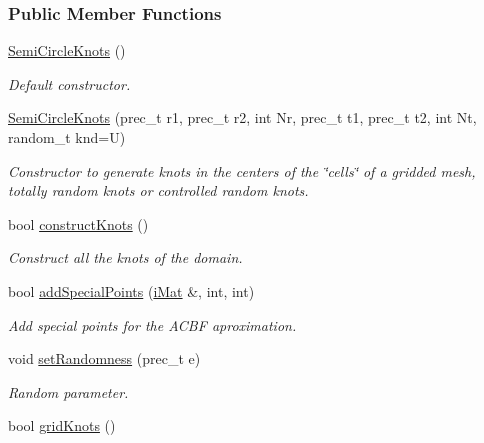 \subsubsection*{Public Member Functions}
\begin{CompactItemize}
\item 
\hypertarget{classSemiCircleKnots_3851deac403877da4fa932e241d6e26b}{
\hyperlink{classSemiCircleKnots_3851deac403877da4fa932e241d6e26b}{SemiCircleKnots} ()}
\label{classSemiCircleKnots_3851deac403877da4fa932e241d6e26b}

\begin{CompactList}\small\item\em Default constructor. \item\end{CompactList}\item 
\hyperlink{classSemiCircleKnots_0fe39c4f9efa84df5b87c0a01d1a3a18}{SemiCircleKnots} (prec\_\-t r1, prec\_\-t r2, int Nr, prec\_\-t t1, prec\_\-t t2, int Nt, random\_\-t knd=U)
\begin{CompactList}\small\item\em Constructor to generate knots in the centers of the \char`\"{}cells\char`\"{} of a gridded mesh, totally random knots or controlled random knots. \item\end{CompactList}\item 
bool \hyperlink{classSemiCircleKnots_af1e7ded0e5a9ed35d61a1ae63621b6d}{constructKnots} ()
\begin{CompactList}\small\item\em Construct all the knots of the domain. \item\end{CompactList}\item 
bool \hyperlink{classSemiCircleKnots_ca6ce9f4726c9dbf661618fff8c296f8}{addSpecialPoints} (\hyperlink{Traits_8hpp_a667f32088e1c93b532a640fe84dc4cd}{iMat} \&, int, int)
\begin{CompactList}\small\item\em Add special points for the ACBF aproximation. \item\end{CompactList}\item 
\hypertarget{classSemiCircleKnots_85f691abe9b494ca1597e3ea9d125ea8}{
void \hyperlink{classSemiCircleKnots_85f691abe9b494ca1597e3ea9d125ea8}{setRandomness} (prec\_\-t e)}
\label{classSemiCircleKnots_85f691abe9b494ca1597e3ea9d125ea8}

\begin{CompactList}\small\item\em Random parameter. \item\end{CompactList}\item 
\hypertarget{classSemiCircleKnots_c57204a83c239f29bdb98885006d6368}{
bool \hyperlink{classSemiCircleKnots_c57204a83c239f29bdb98885006d6368}{gridKnots} ()}
\label{classSemiCircleKnots_c57204a83c239f29bdb98885006d6368}


\end{CompactItemize}
